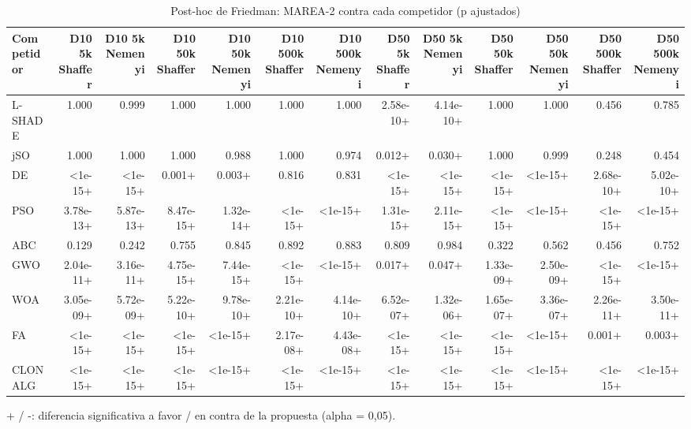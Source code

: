 \begin{table}[ht]\centering\small
\caption{Post-hoc de Friedman: MAREA-2 contra cada competidor (p ajustados)}
\begin{tabular}{lrrrrrrrrrrrr}
\toprule
Competidor & D10 5k Shaffer & D10 5k Nemenyi & D10 50k Shaffer & D10 50k Nemenyi & D10 500k Shaffer & D10 500k Nemenyi & D50 5k Shaffer & D50 5k Nemenyi & D50 50k Shaffer & D50 50k Nemenyi & D50 500k Shaffer & D50 500k Nemenyi \\
\midrule
L-SHADE & 1.000 & 0.999 & 1.000 & 1.000 & 1.000 & 1.000 & 2.58e-10+ & 4.14e-10+ & 1.000 & 1.000 & 0.456 & 0.785 \\
jSO & 1.000 & 1.000 & 1.000 & 0.988 & 1.000 & 0.974 & 0.012+ & 0.030+ & 1.000 & 0.999 & 0.248 & 0.454 \\
DE & <1e-15+ & <1e-15+ & 0.001+ & 0.003+ & 0.816 & 0.831 & <1e-15+ & <1e-15+ & <1e-15+ & <1e-15+ & 2.68e-10+ & 5.02e-10+ \\
PSO & 3.78e-13+ & 5.87e-13+ & 8.47e-15+ & 1.32e-14+ & <1e-15+ & <1e-15+ & 1.31e-15+ & 2.11e-15+ & <1e-15+ & <1e-15+ & <1e-15+ & <1e-15+ \\
ABC & 0.129 & 0.242 & 0.755 & 0.845 & 0.892 & 0.883 & 0.809 & 0.984 & 0.322 & 0.562 & 0.456 & 0.752 \\
GWO & 2.04e-11+ & 3.16e-11+ & 4.75e-15+ & 7.44e-15+ & <1e-15+ & <1e-15+ & 0.017+ & 0.047+ & 1.33e-09+ & 2.50e-09+ & <1e-15+ & <1e-15+ \\
WOA & 3.05e-09+ & 5.72e-09+ & 5.22e-10+ & 9.78e-10+ & 2.21e-10+ & 4.14e-10+ & 6.52e-07+ & 1.32e-06+ & 1.65e-07+ & 3.36e-07+ & 2.26e-11+ & 3.50e-11+ \\
FA & <1e-15+ & <1e-15+ & <1e-15+ & <1e-15+ & 2.17e-08+ & 4.43e-08+ & <1e-15+ & <1e-15+ & <1e-15+ & <1e-15+ & 0.001+ & 0.003+ \\
CLONALG & <1e-15+ & <1e-15+ & <1e-15+ & <1e-15+ & <1e-15+ & <1e-15+ & <1e-15+ & <1e-15+ & <1e-15+ & <1e-15+ & <1e-15+ & <1e-15+ \\
\bottomrule
\end{tabular}
\par\footnotesize + / -: diferencia significativa a favor / en contra de la propuesta (alpha = 0,05).
\end{table}
